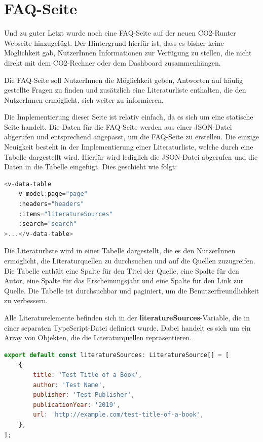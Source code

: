 \section{FAQ-Seite}

Und zu guter Letzt wurde noch eine FAQ-Seite auf der neuen CO2-Runter Webseite hinzugefügt. Der Hintergrund hierfür ist, dass es bisher keine Möglichkeit gab, NutzerInnen Informationen zur Verfügung zu stellen, die nicht direkt mit dem CO2-Rechner oder dem Dashboard zusammenhängen.

Die FAQ-Seite soll NutzerInnen die Möglichkeit geben, Antworten auf häufig gestellte Fragen zu finden und zusätzlich eine Literaturliste enthalten, die den NutzerInnen ermöglicht, sich weiter zu informieren.

Die Implementierung dieser Seite ist relativ einfach, da es sich um eine statische Seite handelt. Die Daten für die FAQ-Seite werden aus einer \acs{JSON}-Datei abgerufen und entsprechend angepasst, um die FAQ-Seite zu erstellen. Die einzige Neuigkeit besteht in der Implementierung einer Literaturliste, welche durch eine Tabelle dargestellt wird. Hierfür wird lediglich die \acs{JSON}-Datei abgerufen und die Daten in die Tabelle eingefügt. Dies geschieht wie folgt:

\begin{lstlisting}[language={JavaScript}, caption={Laden der Literaturliste}]
<v-data-table
    v-model:page="page"
    :headers="headers"
    :items="literatureSources"
    :search="search"
>...</v-data-table>
\end{lstlisting}

Die Literaturliste wird in einer Tabelle dargestellt, die es den NutzerInnen ermöglicht, die Literaturquellen zu durchsuchen und auf die Quellen zuzugreifen. Die Tabelle enthält eine Spalte für den Titel der Quelle, eine Spalte für den Autor, eine Spalte für das Erscheinungsjahr und eine Spalte für den Link zur Quelle. Die Tabelle ist durchsuchbar und paginiert, um die Benutzerfreundlichkeit zu verbessern.

Alle Literaturelemente befinden sich in der \textbf{literatureSources}-Variable, die in einer separaten TypeScript-Datei definiert wurde. Dabei handelt es sich um ein Array von Objekten, die die Literaturquellen repräsentieren.

\begin{lstlisting}[language={JavaScript}, caption={Literaturelemente}]
export default const literatureSources: LiteratureSource[] = [
    {
        title: 'Test Title of a Book',
        author: 'Test Name',
        publisher: 'Test Publisher',
        publicationYear: '2019',
        url: 'http://example.com/test-title-of-a-book',
    },
];
\end{lstlisting}

